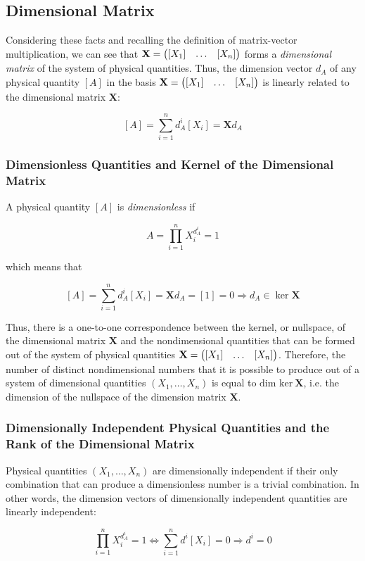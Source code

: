 \subsection{Dimensional Matrix}

Considering these facts and recalling the definition of matrix-vector multiplication, we can see that $\mathbf{X} = \begin{pmatrix} [X_1] & \hdots & [X_n] \end{pmatrix}$ forms a \emph{dimensional matrix} of the system of physical quantities. Thus, the dimension vector $d_A$ of any physical quantity $[A]$ in the basis $\mathbf{X} = \begin{pmatrix} [X_1] & \hdots & [X_n] \end{pmatrix}$ is linearly related to the dimensional matrix $\mathbf{X}$:

$$ [A] = \sum \limits_{i=1}^n d_A^i [X_i] = \mathbf{X}d_A$$

\subsubsection{Dimensionless Quantities and Kernel of the Dimensional Matrix}

A physical quantity $[A]$ is \emph{dimensionless} if 

$$A = \prod \limits_{i=1}^{n} X_i^{d_A^i} = 1 $$ 

which means that 

$$[A] = \sum \limits_{i=1}^n d_A^i [X_i] = \mathbf{X}d_A = [1] = 0 \Longrightarrow d_A \in \ker \mathbf{X}$$ 

Thus, there is a one-to-one correspondence between the kernel, or nullspace, of the dimensional matrix $\mathbf{X}$ and the nondimensional quantities that can be formed out of the system of physical quantities $\mathbf{X} = \begin{pmatrix} [X_1] & \hdots & [X_n] \end{pmatrix}$. Therefore, the number of distinct nondimensional numbers that it is possible to produce out of a system of dimensional quantities $(X_1, \hdots, X_n)$ is equal to $\text{dim ker}~ \mathbf{X}$, i.e. the dimension of the nullspace of the dimension matrix $\mathbf{X}$.

\subsubsection{Dimensionally Independent Physical Quantities and the Rank of the Dimensional Matrix}

Physical quantities $(X_1, \hdots, X_n)$ are dimensionally independent if their only combination that can produce a dimensionless number is a trivial combination. In other words, the dimension vectors of dimensionally independent quantities are linearly independent:

$$ \prod \limits_{i=1}^{n} X_i^{d_A^i} = 1 \Longleftrightarrow \sum \limits_{i=1}^n d^i [X_i] = 0 \Longrightarrow d^i = 0 $$

